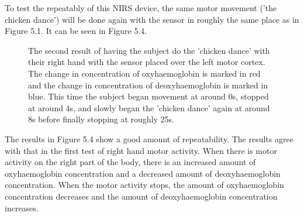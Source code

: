 To test the repeatably of this NIRS device, the same motor movement ('the chicken dance') will be done again with the sensor in roughly the same place as in Figure 5.1. It can be seen in Figure 5.4.

\begin{figure}[htp]
\centering
{}
\caption[Left Motor Cortex Measurements with Motor Movement, Test 2]{The second result of having the subject do the 'chicken dance' with their right hand with the sensor placed over the left motor cortex. The change in concentration of oxyhaemoglobin is marked in red and the change in concentration of deoxyhaemoglobin is marked in blue. This time the subject began movement at around 0s, stopped at around 4s, and slowly began the 'chicken dance' again at around 8s before finally stopping at roughly 25s.}
\end{figure}

The results in Figure 5.4 show a good amount of repeatability. The results agree with that in the first test of right hand motor activity. When there is motor activity on the right part of the body, there is an increased amount of oxyhaemoglobin concentration and a decreased amount of deoxyhaemoglobin concentration. When the motor activity stops, the amount of oxyhaemoglobin concentration decreases and the amount of deoxyhaemoglobin concentration increases.

